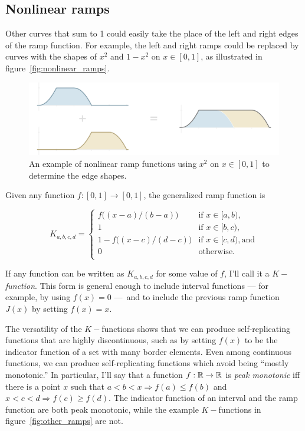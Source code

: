 \documentclass[20pt,]{extarticle}
\begin{document}
\subsection{Nonlinear ramps}\label{sec:nonlinearux5framps}

Other curves that sum to 1 could easily take the place of the left and
right edges of the ramp function. For example, the left and right ramps
could be replaced by curves with the shapes of \(x^2\) and \(1-x^2\) on
\(x\in [0, 1]\), as illustrated in figure~\ref{fig:nonlinear_ramps}.

\begin{figure}[htbp]
\centering
\includegraphics{images/pdfs/nonlinear_ramps2.pdf}
\caption{\label{fig:nonlinear_ramps}An example of nonlinear ramp
functions using \(x^2\) on \(x\in [0, 1]\) to determine the edge
shapes.}\label{fig:nonlinearux5framps}
\end{figure}

Given any function \(f:[0,1]\to [0,1]\), the generalized ramp function
is

\[ K_{a,b,c,d} = \begin{cases}
f\big((x - a) / (b - a)\big) & \text{if } x \in [a, b), \\
1 & \text{if } x \in [b, c), \\
1 - f\big((x - c) / (d - c)\big) & \text{if } x \in [c, d), \text{and} \\
0 & \text{otherwise.} \\
\end{cases}\]

If any function can be written as \(K_{a,b,c,d}\) for some value of
\(f\), I'll call it a \(K-\)\emph{function}. This form is general enough
to include interval functions --- for example, by using \(f(x) = 0\)
---~and to include the previous ramp function \(J(x)\) by setting
\(f(x)=x\).

The versatility of the \(K-\)functions shows that we can produce
self-replicating functions that are highly discontinuous, such as by
setting \(f(x)\) to be the indicator function of a set with many border
elements. Even among continuous functions, we can produce
self-replicating functions which avoid being ``mostly monotonic.'' In
particular, I'll say that a function \(f:\mathbb{R}\to\mathbb{R}\) is \emph{peak
monotonic} iff there is a point \(x\) such that
\(a < b < x \Rightarrow f(a) \le f(b)\) and
\(x < c < d \Rightarrow f(c) \ge f(d)\). The indicator function of an
interval and the ramp function are both peak monotonic, while the
example \(K-\)functions in figure~\ref{fig:other_ramps} are not.
\end{document}
